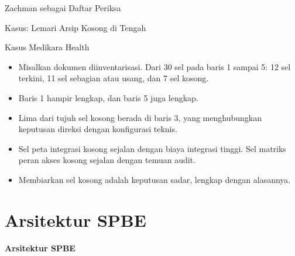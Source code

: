 \documentclass[aspectratio=169, table, 12pt]{beamer}
\begin{document}
\begin{frame}{{\Large Zachman sebagai Daftar Periksa}}
  \centering
  \begingroup
    \renewcommand{\scriptsize}{\fontsize{6.5}{7.5}\selectfont}
    \renewcommand{\tiny}{\fontsize{5}{6}\selectfont}
  \endgroup
\end{frame}

\begin{frame}{{\Large Kasus: Lemari Arsip Kosong di Tengah}}
  \begin{block}{Kasus Medikara Health}
    \small
    \begin{itemize}
      \item Misalkan dokumen diinventarisasi. Dari 30 sel pada baris 1 sampai 5: 12 sel terkini, 11 sel
            sebagian atau usang, dan 7 sel kosong.
      \item Baris 1 hampir lengkap, dan baris 5 juga lengkap.
      \item Lima dari tujuh sel kosong berada di baris 3, yang menghubungkan keputusan direksi dengan
            konfigurasi teknis.
      \item Sel peta integrasi kosong sejalan dengan biaya integrasi tinggi. Sel matriks peran akses
            kosong sejalan dengan temuan audit.
      \item Membiarkan sel kosong adalah keputusan sadar, lengkap dengan alasannya.
    \end{itemize}
  \end{block}
\end{frame}

\section{Arsitektur SPBE}

\begin{frame}{\hfill}
  \centering
  \Huge{\textbf{Arsitektur SPBE}}
\end{frame}
\end{document}
